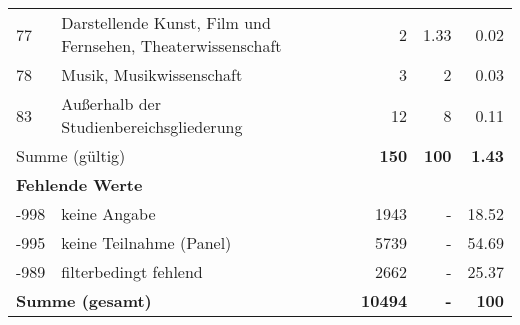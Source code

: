 \begin{longtable}{lXrrr}
        77 & \multicolumn{1}{X}{Darstellende Kunst, Film und Fernsehen, Theaterwissenschaft} & %
          \num{2} &
          \num[round-mode=places,round-precision=2]{1,33} &
          \num[round-mode=places,round-precision=2]{0,02} \\

        78 & \multicolumn{1}{X}{Musik, Musikwissenschaft} & %
          \num{3} &
          \num[round-mode=places,round-precision=2]{2} &
          \num[round-mode=places,round-precision=2]{0,03} \\

        83 & \multicolumn{1}{X}{Außerhalb der Studienbereichsgliederung} & %
          \num{12} &
          \num[round-mode=places,round-precision=2]{8} &
          \num[round-mode=places,round-precision=2]{0,11} \\

     \midrule
     \multicolumn{2}{l}{Summe (gültig)} &
       \textbf{\num{150}} &
     \textbf{100} &
       \textbf{\num[round-mode=places,round-precision=2]{1,43}} \\
     \multicolumn{5}{l}{\textbf{Fehlende Werte}}\\
       -998 &
       keine Angabe &
         \num{1943} &
        - &
         \num[round-mode=places,round-precision=2]{18,52} \\
       -995 &
       keine Teilnahme (Panel) &
         \num{5739} &
        - &
         \num[round-mode=places,round-precision=2]{54,69} \\
       -989 &
       filterbedingt fehlend &
         \num{2662} &
        - &
         \num[round-mode=places,round-precision=2]{25,37} \\
     \midrule
     \multicolumn{2}{l}{\textbf{Summe (gesamt)}} &
          \textbf{\num{10494}} &
        \textbf{-} &
        \textbf{100} \\
     \bottomrule
     \end{longtable}
     
